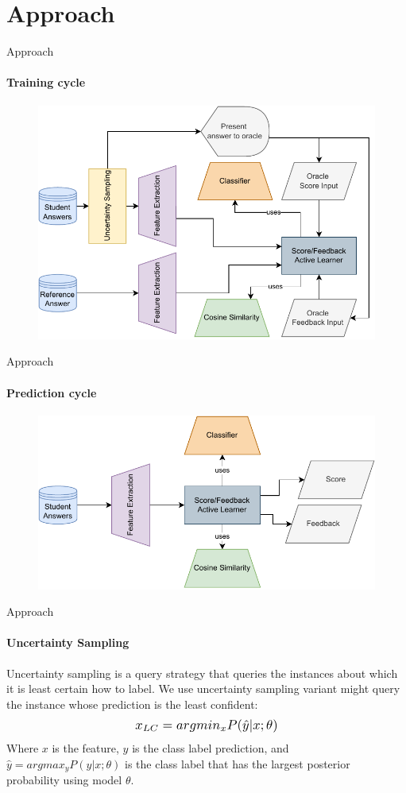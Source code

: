 \documentclass[aspectratio=169]{beamer}
\begin{document}
\section{Approach}
\begin{frame}{Approach}
	\framesubtitle{Training cycle}
	\begin{figure}
		\centering
		\includegraphics[scale = 0.65]{images/architecture_training.pdf}
		\label{fig:architecture train}
	\end{figure}
\end{frame}
\begin{frame}{Approach}
\framesubtitle{Prediction cycle}
\begin{figure}
	\centering
	\includegraphics[scale = 0.65]{images/architecture_prediction.pdf}
	\label{fig:architecture predict}
\end{figure}
\end{frame}
\begin{frame}{Approach}
	\framesubtitle{Uncertainty Sampling}
	Uncertainty sampling is a query strategy that queries the instances about which it is least certain how to label. We use uncertainty sampling variant might query the instance whose prediction is the least confident:
	\begin{equation}
	\label{equation:uncertainty sampling}
	\scalebox{1.2}{$x_{LC} = argmin_{x} P({\hat{y}|x;\theta})$}
	\end{equation}
	Where $x$ is the feature, $y$ is the class label prediction, and $\hat{y} = argmax_y P({y|x;\theta})$ is the class label that has the largest posterior probability using model $\theta$.
\end{frame}
\end{document}
